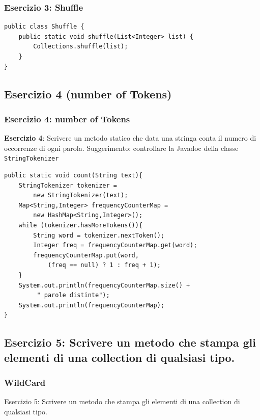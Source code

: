 \documentclass{beamer}
\begin{document}
\begin{frame}[fragile]
\frametitle{Esercizio 3: Shuffle}
\begin{framed}
\begin{lstlisting}
public class Shuffle {
    public static void shuffle(List<Integer> list) {
        Collections.shuffle(list);
    }
}
\end{lstlisting}
\end{framed}
\end{frame}

\subsection{Esercizio 4 (number of Tokens)}
\begin{frame}[fragile]
\frametitle{Esercizio 4: number of Tokens}
\begin{framed}
\textbf{Esercizio 4}: Scrivere un metodo statico che data una stringa conta il numero di occorrenze di ogni parola. Suggerimento: controllare la Javadoc della classe \texttt{StringTokenizer}
\end{framed}
\end{frame}

\begin{frame}[fragile]
\begin{framed}
\begin{lstlisting}
public static void count(String text){
    StringTokenizer tokenizer = 
        new StringTokenizer(text);
    Map<String,Integer> frequencyCounterMap = 
        new HashMap<String,Integer>();
    while (tokenizer.hasMoreTokens()){
        String word = tokenizer.nextToken();
        Integer freq = frequencyCounterMap.get(word);
        frequencyCounterMap.put(word,
            (freq == null) ? 1 : freq + 1);
    }
    System.out.println(frequencyCounterMap.size() +
         " parole distinte");
    System.out.println(frequencyCounterMap);
}
\end{lstlisting}
\end{framed}
\end{frame}


\subsection{Esercizio 5: Scrivere un metodo che stampa gli elementi di una collection di qualsiasi tipo.}
\begin{frame}[fragile]
\frametitle{WildCard}
\begin{framed}
Esercizio 5: Scrivere un metodo che stampa gli elementi di una collection di qualsiasi tipo.
\end{framed}
\end{frame}
\end{document}

